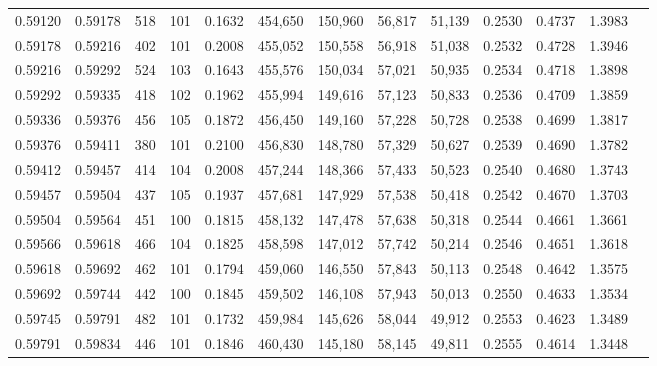 \begin{tabular}{rrrrrrrrrrrrr}
0.59120 & 0.59178 &   518 & 101 &                                     0.1632 & 454,650 & 150,960 &  56,817 &  51,139 & 0.2530 & 0.4737 & 1.3983 \\
0.59178 & 0.59216 &   402 & 101 &                                     0.2008 & 455,052 & 150,558 &  56,918 &  51,038 & 0.2532 & 0.4728 & 1.3946 \\
0.59216 & 0.59292 &   524 & 103 &                                     0.1643 & 455,576 & 150,034 &  57,021 &  50,935 & 0.2534 & 0.4718 & 1.3898 \\
0.59292 & 0.59335 &   418 & 102 &                                     0.1962 & 455,994 & 149,616 &  57,123 &  50,833 & 0.2536 & 0.4709 & 1.3859 \\
0.59336 & 0.59376 &   456 & 105 &                                     0.1872 & 456,450 & 149,160 &  57,228 &  50,728 & 0.2538 & 0.4699 & 1.3817 \\
0.59376 & 0.59411 &   380 & 101 &                                     0.2100 & 456,830 & 148,780 &  57,329 &  50,627 & 0.2539 & 0.4690 & 1.3782 \\
0.59412 & 0.59457 &   414 & 104 &                                     0.2008 & 457,244 & 148,366 &  57,433 &  50,523 & 0.2540 & 0.4680 & 1.3743 \\
0.59457 & 0.59504 &   437 & 105 &                                     0.1937 & 457,681 & 147,929 &  57,538 &  50,418 & 0.2542 & 0.4670 & 1.3703 \\
0.59504 & 0.59564 &   451 & 100 &                                     0.1815 & 458,132 & 147,478 &  57,638 &  50,318 & 0.2544 & 0.4661 & 1.3661 \\
0.59566 & 0.59618 &   466 & 104 &                                     0.1825 & 458,598 & 147,012 &  57,742 &  50,214 & 0.2546 & 0.4651 & 1.3618 \\
0.59618 & 0.59692 &   462 & 101 &                                     0.1794 & 459,060 & 146,550 &  57,843 &  50,113 & 0.2548 & 0.4642 & 1.3575 \\
0.59692 & 0.59744 &   442 & 100 &                                     0.1845 & 459,502 & 146,108 &  57,943 &  50,013 & 0.2550 & 0.4633 & 1.3534 \\
0.59745 & 0.59791 &   482 & 101 &                                     0.1732 & 459,984 & 145,626 &  58,044 &  49,912 & 0.2553 & 0.4623 & 1.3489 \\
0.59791 & 0.59834 &   446 & 101 &                                     0.1846 & 460,430 & 145,180 &  58,145 &  49,811 & 0.2555 & 0.4614 & 1.3448 \\

\end{tabular}
